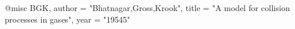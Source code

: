 @misc{ BGK,
       author = "Bhatnagar,Gross,Krook",
       title = "A model for collision processes in gases",
       year = "19545" }